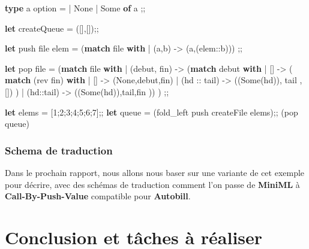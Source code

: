 \documentclass[
  12pt,
]{article}
\newenvironment{Shaded}{}{}
\newcommand{\DataTypeTok}[1]{\textcolor[rgb]{0.56,0.13,0.00}{#1}}
\newcommand{\DecValTok}[1]{\textcolor[rgb]{0.25,0.63,0.44}{#1}}
\newcommand{\KeywordTok}[1]{\textcolor[rgb]{0.00,0.44,0.13}{\textbf{#1}}}
\newcommand{\NormalTok}[1]{#1}
\begin{document}
\begin{Shaded}
\begin{Highlighting}[]
  \KeywordTok{type}\NormalTok{ \textquotesingle{}a }\DataTypeTok{option}\NormalTok{ =}
\NormalTok{  | }\DataTypeTok{None}
\NormalTok{  | }\DataTypeTok{Some} \KeywordTok{of}\NormalTok{ \textquotesingle{}a}
\NormalTok{  ;;}

  \KeywordTok{let}\NormalTok{ createQueue = ([],[]);;}

  \KeywordTok{let}\NormalTok{ push file elem = }
\NormalTok{  (}\KeywordTok{match}\NormalTok{ file }\KeywordTok{with}
\NormalTok{  | (a,b) {-}\textgreater{} (a,(elem::b)))}
\NormalTok{  ;;}

  \KeywordTok{let}\NormalTok{ pop file =}
\NormalTok{    (}\KeywordTok{match}\NormalTok{ file }\KeywordTok{with}
\NormalTok{    | (debut, fin) {-}\textgreater{} }
\NormalTok{      (}\KeywordTok{match}\NormalTok{ debut }\KeywordTok{with}
\NormalTok{      | [] {-}\textgreater{} (}
                \KeywordTok{match}\NormalTok{ (rev fin) }\KeywordTok{with}
\NormalTok{                | [] {-}\textgreater{} (}\DataTypeTok{None}\NormalTok{,debut,fin)}
\NormalTok{                | (hd :: tail) {-}\textgreater{} ((}\DataTypeTok{Some}\NormalTok{(hd)), tail ,[])}
\NormalTok{              )}
\NormalTok{      | (hd::tail) {-}\textgreater{} ((}\DataTypeTok{Some}\NormalTok{(hd)),tail,fin ))}
\NormalTok{    )}
\NormalTok{  ;;}

  \KeywordTok{let}\NormalTok{ elems = [}\DecValTok{1}\NormalTok{;}\DecValTok{2}\NormalTok{;}\DecValTok{3}\NormalTok{;}\DecValTok{4}\NormalTok{;}\DecValTok{5}\NormalTok{;}\DecValTok{6}\NormalTok{;}\DecValTok{7}\NormalTok{];;}
  \KeywordTok{let}\NormalTok{ queue = (fold\_left push createFile elems);;}
\NormalTok{  (pop queue)}
\end{Highlighting}
\end{Shaded}

\hypertarget{schema-de-traduction}{%
\subsubsection{Schema de traduction}\label{schema-de-traduction}}

Dans le prochain rapport, nous allons nous baser sur une variante de cet
exemple pour décrire, avec des schémas de traduction comment l'on passe
de \textbf{MiniML} à \textbf{Call-By-Push-Value} compatible pour
\textbf{Autobill}.

\hypertarget{conclusion-et-tuxe2ches-uxe0-ruxe9aliser}{%
\section{Conclusion et tâches à
réaliser}\label{conclusion-et-tuxe2ches-uxe0-ruxe9aliser}}
\end{document}
